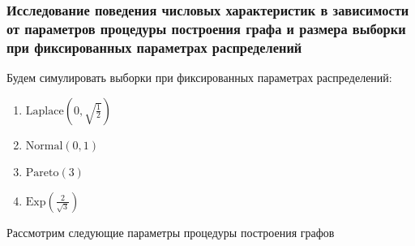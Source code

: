 \documentclass[a4paper,12pt]{article}
\begin{document}
\subsubsection{Исследование поведения числовых характеристик в зависимости от параметров процедуры построения графа и размера выборки при фиксированных параметрах распределений}
Будем симулировать выборки при фиксированных параметрах распределений:
\begin{enumerate}
    \item $\text{Laplace}\left( 0, \sqrt{\frac{1}{2}}\right)$
    \item $\text{Normal} \left(0, 1 \right)$
    \item $\text{Pareto} (3)$
    \item $\text{Exp} \left(\frac{2}{\sqrt{3}} \right)$
\end{enumerate}
Рассмотрим следующие параметры процедуры построения графов
\end{document}
